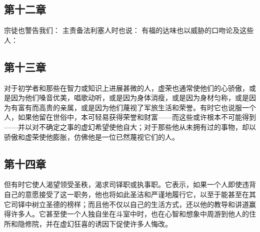 
\subsection{第十二章}

\par

宗徒也警告我们： 主责备法利塞人时也说： 有福的达味也以威胁的口吻论及这些人：\par


\subsection{第十三章}

\par

对于初学者和那些在智力或知识上进展甚微的人，虚荣也通常使他们的心骄傲，或是因为他们嗓音优美，唱歌动听，或是因为身体消瘦，或是因为身材匀称，或是因为有富有而高贵的亲属，或是因为他们蔑视了军旅生活和荣誉。有时它也说服一个人，如果他留在世俗中，本可轻易获得荣誉和财富——而这些或许根本不可能得到——并以对不确定之事的虚幻希望使他自大；对于那些他从未拥有过的事物，却以骄傲和虚荣使他膨胀，仿佛他是一位已然蔑视它们的人。\par


\subsection{第十四章}

\par

但有时它使人渴望领受圣秩，渴求司铎职或执事职。它表示，如果一个人即使违背自己的意愿接受了这一职务，他也将如此圣洁和严谨地履行它，以至于能甚至在其它司铎中树立圣德的榜样；而且他不仅以自己的生活方式，还以他的教导和讲道赢得许多人。它甚至使一个人独自坐在斗室中时，也在心智和想象中周游到他人的住所和隐修院，并在虚幻狂喜的诱因下促使许多人悔改。\par

